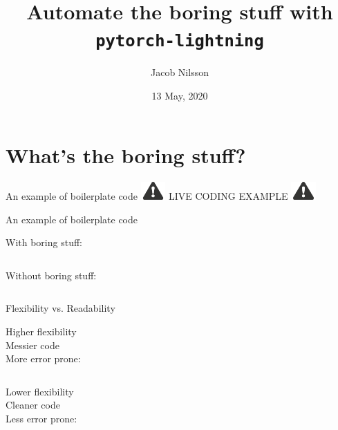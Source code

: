 \documentclass[aspectratio=169]{beamer}
\title{Automate the boring stuff with \texttt{pytorch-lightning}}
\date{13 May, 2020}
\author{Jacob Nilsson}
\institute{Luleå University of Technology}
\newcommand{\alertsymb}{\includegraphics[height=0.7cm]{alert.png}}
\newcommand{\livecode}{\Large \centering \alertsymb \hspace{1em}
	LIVE CODING EXAMPLE \hspace{1em} \alertsymb}
\begin{document}
	\maketitle
	\section{What's the boring stuff?}
	\begin{frame}{An example of boilerplate code}
		\livecode
	\end{frame}

	\begin{frame}{An example of boilerplate code}
		\begin{minipage}[b]{0.45\textwidth}
			With boring stuff:\\[1em]

			\inputminted[firstline=4, lastline=7]{python}{
			../boilerplate-example-finished.py}
		\end{minipage}\hfill
		\begin{minipage}[b]{0.45\textwidth}
			Without boring stuff:\\[1em]

			\inputminted[firstline=11, lastline=14]{python}{
			../boilerplate-example-finished.py}
		\end{minipage}
	\end{frame}

	\begin{frame}{Flexibility vs. Readability}
		\begin{minipage}[b]{0.45\textwidth}
			Higher flexibility\\
			Messier code\\
			More error prone:\\[1em]

			\inputminted[firstline=4, lastline=7]{python}{
			../boilerplate-example-finished.py}
		\end{minipage}\hfill
		\begin{minipage}[b]{0.45\textwidth}
			Lower flexibility\\
			Cleaner code\\
			Less error prone:\\[1em]

			\inputminted[firstline=11, lastline=14]{python}{
			../boilerplate-example-finished.py}
		\end{minipage}
	\end{frame}
\end{document}
